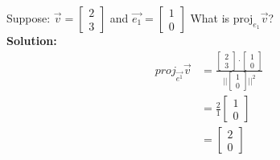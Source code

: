 \documentclass[11pt]{article}
\theoremstyle{plain}
\theoremstyle{remark}
\theoremstyle{plain}
\newcommand{\bd}{\textbf}
\begin{document}
\begin{tcolorbox}[colback=magenta!5!white,colframe=magenta!75!black,title=Example]
    Suppose: $\overrightarrow{v} = \begin{bmatrix}
        2 \\3
    \end{bmatrix}$ and $\overrightarrow{e_1} = \begin{bmatrix}
        1\\0
    \end{bmatrix}$ What is $\text{proj}_{e_1}\overrightarrow{v}$?\\

    \bd{Solution:}
    \begin{align*}
        proj_{\overrightarrow{e^1}}\overrightarrow{v} &=\frac{\begin{bmatrix}
            2\\3
        \end{bmatrix}\cdot\begin{bmatrix}
            1\\0
        \end{bmatrix}}{||\begin{bmatrix}
            1\\0
        \end{bmatrix}||^2} \\
        &= \frac{2}{1}\begin{bmatrix}
            1\\0
        \end{bmatrix} \\
        &= \begin{bmatrix}
            2\\0
        \end{bmatrix}
    \end{align*}
\end{tcolorbox}   
\end{document}
